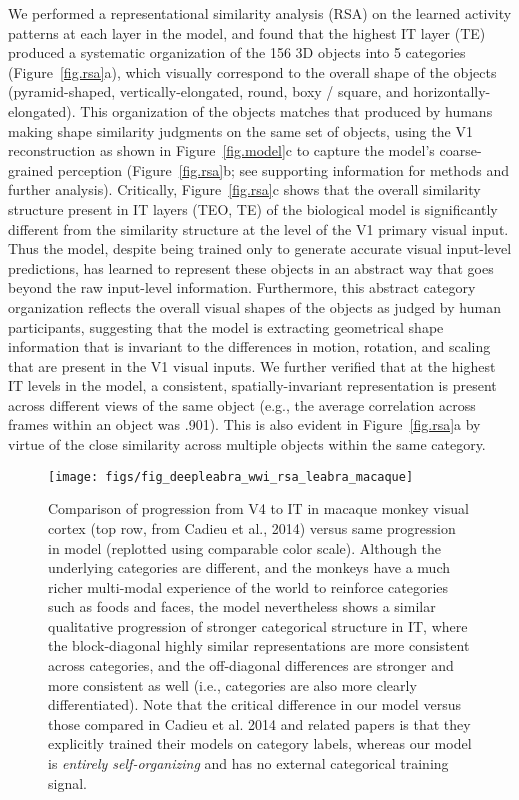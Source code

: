 \documentclass[12pt,twoside,lineno]{pnas-new}  %
\begin{document}
We performed a representational similarity analysis (RSA) on the learned activity patterns at each layer in the model, and found that the highest IT layer (TE) produced a systematic organization of the 156 3D objects into 5 categories (Figure~\ref{fig.rsa}a), which visually correspond to the overall shape of the objects (pyramid-shaped, vertically-elongated, round, boxy / square, and horizontally-elongated). This organization of the objects matches that produced by humans making shape similarity judgments on the same set of objects, using the V1 reconstruction as shown in Figure~\ref{fig.model}c to capture the model's coarse-grained perception (Figure~\ref{fig.rsa}b; see supporting information for methods and further analysis).  Critically, Figure~\ref{fig.rsa}c shows that the overall similarity structure present in IT layers (TEO, TE) of the biological model is significantly different from the similarity structure at the level of the V1 primary visual input.  Thus the model, despite being trained only to generate accurate visual input-level predictions, has learned to represent these objects in an abstract way that goes beyond the raw input-level information.  Furthermore, this abstract category organization reflects the overall visual shapes of the objects as judged by human participants, suggesting that the model is extracting geometrical shape information that is invariant to the differences in motion, rotation, and scaling that are present in the V1 visual inputs.  We further verified that at the highest IT levels in the model, a consistent, spatially-invariant representation is present across different views of the same object (e.g., the average correlation across frames within an object was .901).  This is also evident in Figure~\ref{fig.rsa}a by virtue of the close similarity across multiple objects within the same category.

\begin{figure}
  \centering\texttt{[image: figs/fig\_deepleabra\_wwi\_rsa\_leabra\_macaque]}
  \caption{\small  Comparison of progression from V4 to IT in macaque monkey visual cortex (top row, from Cadieu et al., 2014) versus same progression in model (replotted using comparable color scale).  Although the underlying categories are different, and the monkeys have a much richer multi-modal experience of the world to reinforce categories such as foods and faces, the model nevertheless shows a similar qualitative progression of stronger categorical structure in IT, where the block-diagonal highly similar representations are more consistent across categories, and the off-diagonal differences are stronger and more consistent as well (i.e., categories are also more clearly differentiated).  Note that the critical difference in our model versus those compared in Cadieu et al. 2014 and related papers is that they explicitly trained their models on category labels, whereas our model is {\em entirely self-organizing} and has no external categorical training signal.}
  \label{fig.macaque}
\end{figure}
\end{document}
